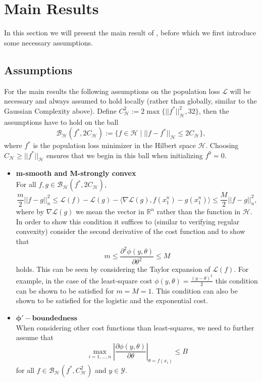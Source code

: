\section{Main Results}
In this section we will present the main result of \cite{wei2017early}, before which we first introduce some necessary assumptions.
\subsection{Assumptions}
For the main results the following assumptions on the population loss $\mathcal{L}$ will be necessary and always assumed to hold locally (rather than globally, similar to the Gaussian Complexity above). Define $C_{\mathcal{H}}^2 := 2\max\{||f^*||_{\mathcal{H}}^2, 32\}$, then the assumptions have to hold on the ball
\begin{equation}
\mathcal{B}_{\mathcal{H}}(f^*,2C_{\mathcal{H}}) := \{f\in\mathcal{H} \mid ||f-f^*||_{\mathcal{H}} \le 2C_{\mathcal{H}}\},
\end{equation}
where $f^*$ is the population loss minimizer in the Hilbert space $\mathcal{H}$. Choosing $C_{\mathcal{H}}\geq ||f^*||_{\mathcal{H}}$ ensures that we begin in this ball when initializing $f^0=0$.
\begin{itemize}
\item \textbf{m-smooth and M-strongly convex}\\
For all $f,g \in \mathcal{B}_{\mathcal{H}}(f^*,2C_{\mathcal{H}})$,
\begin{equation}
\frac{m}{2}||f-g||_n^2 \le \mathcal{L}(f) - \mathcal{L}(g) - \langle \nabla\mathcal{L}(g), f(x_1^n) - g(x_1^n)\rangle \le \frac{M}{2}||f-g||_n^2,
\end{equation}
where by $\nabla\mathcal{L}(g)$ we mean the vector in $\mathbb{R}^n$ rather than the function in $\mathcal{H}$. In order to show this condition it suffices to (similar to verifying regular convexity) consider the second derivative of the cost function and to show that
\begin{equation*}
m\le \frac{\partial^2\phi(y,\theta)}{\partial\theta^2} \le M
\end{equation*}
holds. This can be seen by considering the Taylor expansion of $\mathcal{L}(f)$. For example, in the case of the least-square cost $\phi(y,\theta)=\frac{(y-\theta)^2}{2}$ this condition can be shown to be satisfied for $m=M=1$. This condition can also be shown to be satisfied for the logistic and the exponential cost.

\item $\mathbf{\phi'-boundedness}$\\
When considering other cost functions than least-squares, we need to further assume that
\begin{equation}
\max_{i=1,...,n}\left\lvert \frac{\partial\phi(y,\theta)}{\partial \theta}\right\rvert_{\theta=f(x_i)} \le B
\end{equation}
for all $f\in \mathcal{B}_{\mathcal{H}}(f^*,C_{\mathcal{H}}^2)$ and $y\in \mathcal{Y}$.

\end{itemize}

